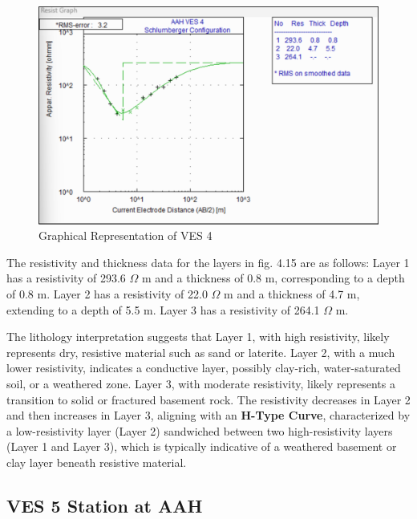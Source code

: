 \documentclass[12pt,a4paper]{report}
\begin{document}
\begin{figure}[H]
    \centering
    \includegraphics[width=1.0\textwidth]{aah_ves4.png}
    \caption{Graphical Representation of VES 4}
    \label{fig:AAH_VES_4_Curve}
\end{figure}
The resistivity and thickness data for the layers in fig. 4.15 are as follows: Layer 1 has a resistivity of 293.6 $\Omega$ m and a thickness of 0.8 m, corresponding to a depth of 0.8 m. Layer 2 has a resistivity of 22.0 $\Omega$ m and a thickness of 4.7 m, extending to a depth of 5.5 m. Layer 3 has a resistivity of 264.1 $\Omega$ m.

The lithology interpretation suggests that Layer 1, with high resistivity, likely represents dry, resistive material such as sand or laterite. Layer 2, with a much lower resistivity, indicates a conductive layer, possibly clay-rich, water-saturated soil, or a weathered zone. Layer 3, with moderate resistivity, likely represents a transition to solid or fractured basement rock. The resistivity decreases in Layer 2 and then increases in Layer 3, aligning with an \textbf{H-Type Curve}, characterized by a low-resistivity layer (Layer 2) sandwiched between two high-resistivity layers (Layer 1 and Layer 3), which is typically indicative of a weathered basement or clay layer beneath resistive material.

\subsection{VES 5 Station at AAH}
\end{document}
